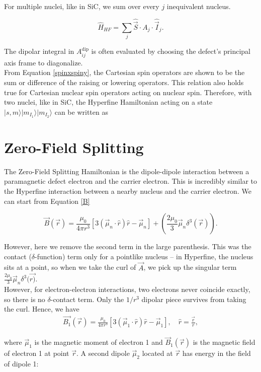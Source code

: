 \documentclass[svgnames]{article}
\begin{document}
For multiple nuclei, like in SiC, we sum over every $j$ inequivalent nucleus. 

\[ \hat{H}_{HF} = \sum_j \hat{\vec{S}} \cdot A_j \cdot \hat{\vec{I}}_j.\] 

The dipolar integral in $A_{ij}^\text{dip}$ is often evaluated by choosing the
defect's principal axis frame to diagonalize. \\

From Equation \ref{spinxspiny}, the Cartesian spin operators are shown to be the
sum or difference of the raising or lowering operators. This relation also holds
true for Cartesian nuclear spin operators acting on nuclear spin. Therefore, with two nuclei, like
in SiC, the Hyperfine Hamiltonian acting on a state $|s, m\rangle
|m_{I_1}\rangle |m_{I_2}\rangle$ can be written as 

\section{Zero-Field Splitting}

The Zero-Field Splitting Hamiltonian is the dipole-dipole interaction between a
paramagnetic defect electron and the carrier electron. This is incredibly
similar to the Hyperfine interaction between a nearby nucleus and the carrier
electron. We can start from Equation \ref{B}

\[ 
      \vec{B}(\vec{r}) = \frac{\mu_0}{4\pi r^3} \left[ 3(\vec{\mu}_n \cdot
      \hat{r})\hat{r} - \vec{\mu}_n \right] + \left( \frac{2\mu_0}{3}\vec{\mu}_n
      \delta^3(\vec{r}) \right). 
  \]

However, here we remove the second term in the large parenthesis. This was the
contact ($\delta$-function) term only for a pointlike nucleus -- in Hyperfine,
the nucleus sits at a point, so when we take the curl of $\vec{A}$, we pick up
the singular term $\frac{2\mu_0}{3}\vec{\mu}_n\delta^3(\vec{r)}$. \\ 

However, for electron-electron interactions, two electrons never coincide
exactly, so there is no $\delta$-contact term. Only the $1/r^3$ dipolar piece
survives from taking the curl. Hence, we have 
\begin{align} 
      \vec{B_1}(\vec{r}) = \frac{\mu_0}{4\pi r^3} \left[ 3(\vec{\mu}_1 \cdot
      \hat{r})\hat{r} - \vec{\mu}_1 \right], \quad \hat{r} = \frac{\vec{r}}{r},  
\end{align}

where $\vec{\mu}_1$ is the magnetic moment of electron 1 and 
$\vec{B}_1(\vec{r})$ is the magnetic field of electron 1 at point
$\vec{r}$. A second dipole $\vec{\mu}_2$ located at $\vec{r}$ has energy in the
field of dipole 1: 
\end{document}
